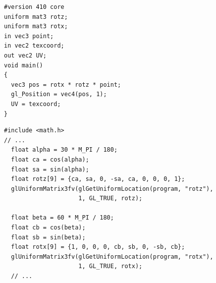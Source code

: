 \documentclass[calcdimensions,landscape,letterpaper]{powersem}
\newcommand{\thecurrentheading}{}
\newcommand{\heading}[1]{\renewcommand{\thecurrentheading}{#1}}
\begin{document}
\begin{slide}
    \heading{3D: Rotations}
    \begin{center}
        \begin{minipage}[c]{.5\textwidth}
            \begin{verbatim}
#version 410 core
uniform mat3 rotz;
uniform mat3 rotx;
in vec3 point;
in vec2 texcoord;
out vec2 UV;
void main()
{
  vec3 pos = rotx * rotz * point;
  gl_Position = vec4(pos, 1);
  UV = texcoord;
}
            \end{verbatim}
        \end{minipage}
    \end{center}
\end{slide}

\begin{slide}
    \heading{3D: Uniform Rotation Matrices}
    \begin{center}
        \begin{minipage}[c]{.95\textwidth}
            \begin{verbatim}
#include <math.h>
// ...
  float alpha = 30 * M_PI / 180;
  float ca = cos(alpha);
  float sa = sin(alpha);
  float rotz[9] = {ca, sa, 0, -sa, ca, 0, 0, 0, 1};
  glUniformMatrix3fv(glGetUniformLocation(program, "rotz"),
                     1, GL_TRUE, rotz);

  float beta = 60 * M_PI / 180;
  float cb = cos(beta);
  float sb = sin(beta);
  float rotx[9] = {1, 0, 0, 0, cb, sb, 0, -sb, cb};
  glUniformMatrix3fv(glGetUniformLocation(program, "rotx"),
                     1, GL_TRUE, rotx);
  // ...
            \end{verbatim}
        \end{minipage}
    \end{center}
\end{slide}
\end{document}
